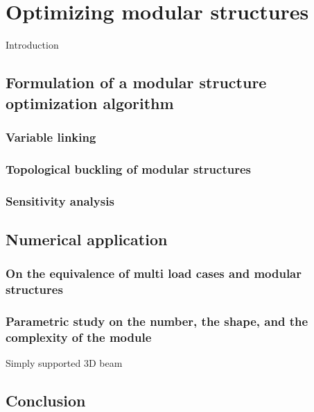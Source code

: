 \setchapterpreamble[u]{\margintoc}
\chapter{Optimizing modular structures}
Introduction
\section{Formulation of a modular structure optimization algorithm}
\subsection{Variable linking}
\subsection{Topological buckling of modular structures}
\subsection{Sensitivity analysis}
\section{Numerical application}
\subsection{On the equivalence of multi load cases and modular structures}
\subsection{Parametric study on the number, the shape, and the complexity of the module}
Simply supported 3D beam
\section{Conclusion}